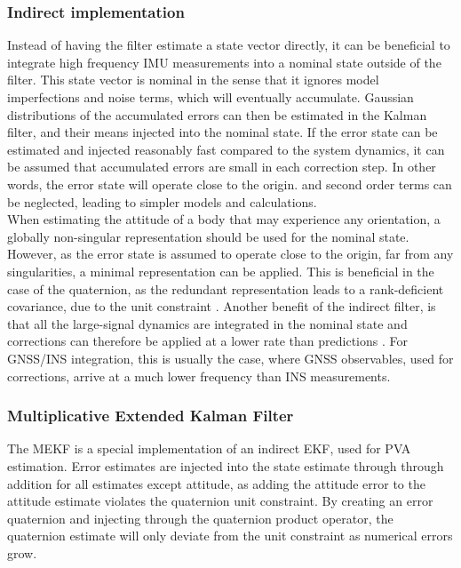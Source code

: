 
    \subsubsection{Indirect implementation}
    Instead of having the filter estimate a state vector directly, it can be beneficial to integrate high frequency IMU measurements into a nominal state outside of the filter. This state vector is nominal in the sense that it ignores model imperfections and noise terms, which will eventually accumulate. Gaussian distributions of the accumulated errors can then be estimated in the Kalman filter, and their means injected into the nominal state. If the error state can be estimated and injected reasonably fast compared to the system dynamics, it can be assumed that accumulated errors are small in each correction step. In other words, the error state will operate close to the origin. and second order terms can be neglected, leading to simpler models and calculations. \\
        
    When estimating the attitude of a body that may experience any orientation, a globally non-singular representation should be used for the nominal state. However, as the error state is assumed to operate close to the origin, far from any singularities, a minimal representation can be applied. This is beneficial in the case of the quaternion, as the redundant representation leads to a rank-deficient covariance, due to the unit constraint \cite{markley2003attitude}. Another benefit of the indirect filter, is that all the large-signal dynamics are integrated in the nominal state and corrections can therefore be applied at a lower rate than predictions \cite{sola2017quaternion}. For GNSS/INS integration, this is usually the case, where GNSS observables, used for corrections, arrive at a much lower frequency than INS measurements.
    
    \subsubsection{Multiplicative Extended Kalman Filter}
    The MEKF is a special implementation of an indirect EKF, used for PVA estimation. Error estimates are injected into the state estimate through through addition for all estimates except attitude, as adding the attitude error to the attitude estimate violates the quaternion unit constraint. By creating an error quaternion and injecting through the quaternion product operator, the quaternion estimate will only deviate from the unit constraint as numerical errors grow.

